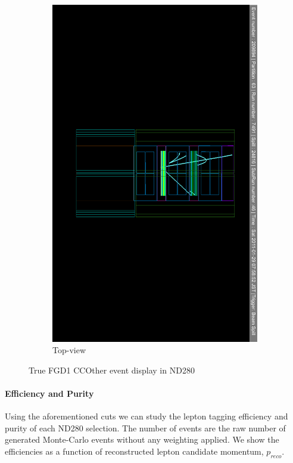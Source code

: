 \begin{itemize}
\begin{figure}[h]
\begin{subfigure}[t]{0.49\textwidth}
			\includegraphics[width=\textwidth, trim={3cm 16cm 3cm 16cm}, clip]{figures/numu/evtdisplay/CCOthers_7491_46_209894_ortX0Z_all}
			\caption{Top-view}
		\end{subfigure}
		\caption{True FGD1 CCOther event display in ND280}
		\label{fig:ccoth_evtdisplay}
	\end{figure}
\end{itemize}

\paragraph{Efficiency and Purity}
Using the aforementioned cuts we can study the lepton tagging efficiency and purity of each ND280 \numu selection. The number of events are the raw number of generated Monte-Carlo events without any weighting applied. We show the efficiencies as a function of reconstructed lepton candidate momentum, $p_{reco}$.

